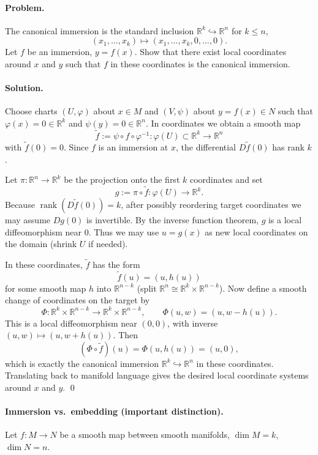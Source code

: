 \documentclass[12pt,a4paper]{article}
\theoremstyle{plain}
\theoremstyle{definition}      %
\begin{document}
\paragraph{Problem.}
The canonical immersion is the standard inclusion $\mathbb{R}^k\hookrightarrow\mathbb{R}^n$ for $k\le n$,
\[
(x_1,\dots,x_k)\longmapsto (x_1,\dots,x_k,0,\dots,0).
\]
Let $f$ be an immersion, $y=f(x)$. Show that there exist local coordinates around $x$ and $y$
such that $f$ in these coordinates is the canonical immersion.

\paragraph{Solution.}
Choose charts $(U,\varphi)$ about $x\in M$ and $(V,\psi)$ about $y=f(x)\in N$ such that
$\varphi(x)=0\in\mathbb{R}^k$ and $\psi(y)=0\in\mathbb{R}^n$. In coordinates we obtain a smooth map
\[
\tilde f := \psi\circ f\circ \varphi^{-1} : \varphi(U)\subset\mathbb{R}^k \longrightarrow \mathbb{R}^n
\]
with $\tilde f(0)=0$. Since $f$ is an immersion at $x$, the differential $D\tilde f(0)$ has rank $k$.

Let $\pi:\mathbb{R}^n\to\mathbb{R}^k$ be the projection onto the first $k$ coordinates and set
\[
g:=\pi\circ \tilde f : \varphi(U)\to \mathbb{R}^k.
\]
Because $\operatorname{rank}(D\tilde f(0))=k$, after possibly reordering target coordinates we may assume
$Dg(0)$ is invertible. By the inverse function theorem, $g$ is a local diffeomorphism near $0$.
Thus we may use $u=g(x)$ as new local coordinates on the domain (shrink $U$ if needed).

In these coordinates, $\tilde f$ has the form
\[
\tilde f(u)=(u,h(u))
\]
for some smooth map $h$ into $\mathbb{R}^{n-k}$ (split $\mathbb{R}^n\cong\mathbb{R}^k\times\mathbb{R}^{n-k}$).
Now define a smooth change of coordinates on the target by
\[
\Phi:\mathbb{R}^k\times\mathbb{R}^{n-k}\to\mathbb{R}^k\times\mathbb{R}^{n-k},\qquad
\Phi(u,w)=(u,w-h(u)).
\]
This is a local diffeomorphism near $(0,0)$, with inverse $(u,w)\mapsto (u,w+h(u))$.
Then
\[
(\Phi\circ \tilde f)(u)=\Phi(u,h(u))=(u,0),
\]
which is exactly the canonical immersion $\mathbb{R}^k\hookrightarrow\mathbb{R}^n$ in these coordinates.
Translating back to manifold language gives the desired local coordinate systems around $x$ and $y$.
\qed


\paragraph{Immersion vs.\ embedding (important distinction).}
Let $f:M\to N$ be a smooth map between smooth manifolds, $\dim M=k$, $\dim N=n$.
\end{document}

